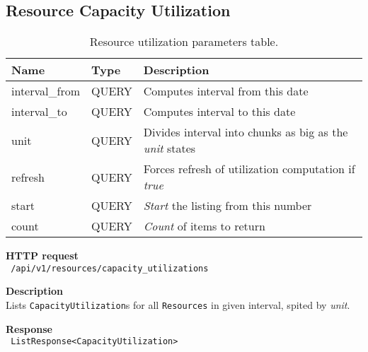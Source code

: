 \subsection{Resource Capacity Utilization}
\begin{table}[ht!]
    \begin{tabularx}{\textwidth}{llX}
        \toprule
        Name & Type & Description \\
        \midrule
        interval\_from & QUERY & Computes interval from this date \\  
        interval\_to & QUERY & Computes interval to this date \\
        unit & QUERY & Divides interval into chunks as big as the \emph{unit} states \\
        refresh & QUERY & Forces refresh of utilization computation if \emph{true} \\
        start & QUERY & \emph{Start} the listing from this number \\  
        count & QUERY & \emph{Count} of items to return
        \end{tabularx}
    \caption{Resource utilization parameters table.}
\end{table}
\begin{description}
    \item \textbf{HTTP request}\\
        \texttt{\text{[GET]} /api/v1/resources/capacity\_utilizations}
    \item \textbf{Description}\\
        Lists \texttt{CapacityUtilization}s for all \texttt{Resources} in given interval, spited by \emph{unit}.
    \item \textbf{Response}\\
        \texttt{\text{[200 OK]} ListResponse<CapacityUtilization>}
\end{description}